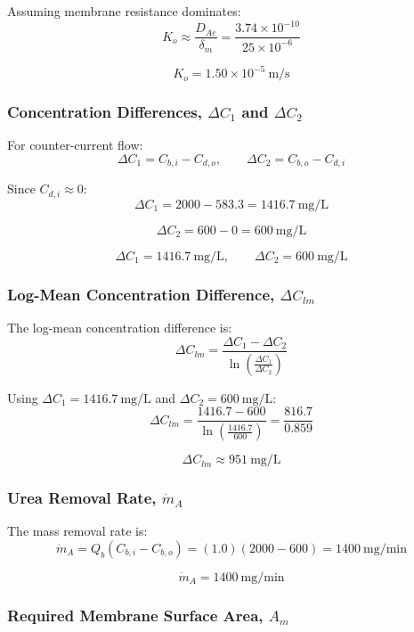 \documentclass[10.5pt]{article}
\begin{document}
Assuming membrane resistance dominates:
\[
    K_o \approx \frac{D_{Ae}}{\delta_m}
    = \frac{3.74 \times 10^{-10}}{25 \times 10^{-6}}
\]

\[
    \boxed{K_o=1.50 \times 10^{-5} \ \text{m/s}}
\]

\subsubsection{Concentration Differences, $\Delta C_1$ and $\Delta C_2$}

For counter-current flow:
\[
    \Delta C_1 = C_{b,i}-C_{d,o},
    \qquad
    \Delta C_2 = C_{b,o}-C_{d,i}
\]

Since $C_{d,i}\approx 0$:
\[
    \Delta C_1 = 2000-583.3 = 1416.7 \ \text{mg/L}
\]

\[
    \Delta C_2 = 600-0 = 600 \ \text{mg/L}
\]

\[
    \boxed{\Delta C_1=1416.7 \ \text{mg/L}},
    \qquad
    \boxed{\Delta C_2=600 \ \text{mg/L}}
\]

\subsubsection{Log-Mean Concentration Difference, $\Delta C_{lm}$}

The log-mean concentration difference is:
\[
    \Delta C_{lm}
    =
    \frac{\Delta C_1-\Delta C_2}
    {\ln\left(\frac{\Delta C_1}{\Delta C_2}\right)}
\]

Using $\Delta C_1=1416.7 \ \text{mg/L}$ and $\Delta C_2=600 \ \text{mg/L}$:
\[
    \Delta C_{lm}
    =
    \frac{1416.7-600}
    {\ln\left(\frac{1416.7}{600}\right)}
    =
    \frac{816.7}{0.859}
\]

\[
    \boxed{\Delta C_{lm} \approx 951 \ \text{mg/L}}
\]

\subsubsection{Urea Removal Rate, $\dot{m}_A$}

The mass removal rate is:
\[
    \dot{m}_A = Q_b(C_{b,i}-C_{b,o})
    = (1.0)(2000-600)
    = 1400 \ \text{mg/min}
\]

\[
    \boxed{\dot{m}_A = 1400 \ \text{mg/min}}
\]

\subsubsection{Required Membrane Surface Area, $A_m$}
\end{document}
